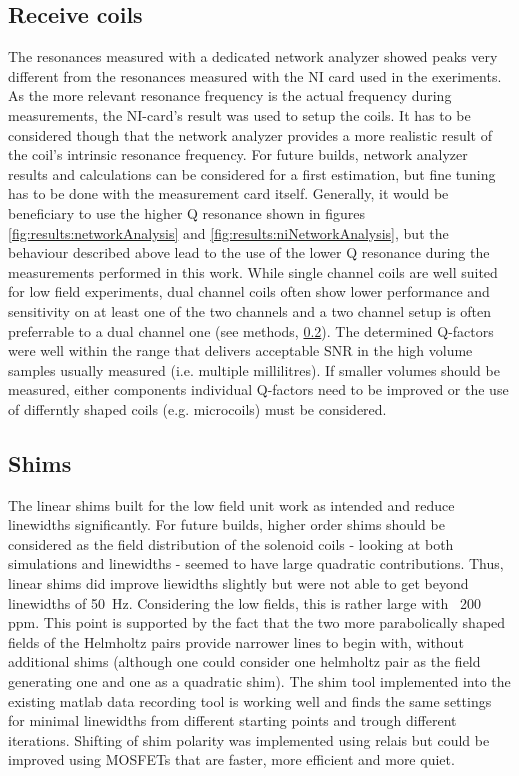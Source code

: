         \subsection{Receive coils}
            The resonances measured with a dedicated network analyzer showed peaks very different from the resonances measured with the NI card used in the exeriments. As the more relevant resonance frequency is the actual frequency during measurements, the NI-card's result was used to setup the coils. It has to be considered though that the network analyzer provides a more realistic result of the coil's intrinsic resonance frequency. For future builds, network analyzer results and calculations can be considered for a first estimation, but fine tuning has to be done with the measurement card itself. Generally, it would be beneficiary to use the higher Q resonance shown in figures \ref{fig:results:networkAnalysis} and \ref{fig:results:niNetworkAnalysis}, but the behaviour described above lead to the use of the lower Q resonance during the measurements performed in this work.
            While single channel coils are well suited for low field experiments, dual channel coils often show lower performance and sensitivity on at least one of the two channels and a two channel setup is often preferrable to a dual channel one (see methods, \ref{}). The determined Q-factors were well within the range that delivers acceptable SNR in the high volume samples usually measured (i.e. multiple millilitres). If smaller volumes should be measured, either components individual Q-factors need to be improved or the use of differntly shaped coils (e.g. microcoils) must be considered.
        \subsection{Shims}
            The linear shims built for the low field unit work as intended and reduce linewidths significantly. For future builds, higher order shims should be considered as the field distribution of the solenoid coils - looking at both simulations and linewidths - seemed to have large quadratic contributions. Thus, linear shims did improve liewidths slightly but were not able to get beyond linewidths of \SI{50}{\hertz}. Considering the low fields, this is rather large with ~200 ppm. This point is supported by the fact that the two more parabolically shaped fields of the Helmholtz pairs provide narrower lines to begin with, without additional shims (although one could consider one helmholtz pair as the field generating one and one as a quadratic shim). The shim tool implemented into the existing matlab data recording tool is working well and finds the same settings for minimal linewidths from different starting points and trough different iterations. Shifting of shim polarity was implemented using relais but could be improved using MOSFETs that are faster, more efficient and more quiet.
